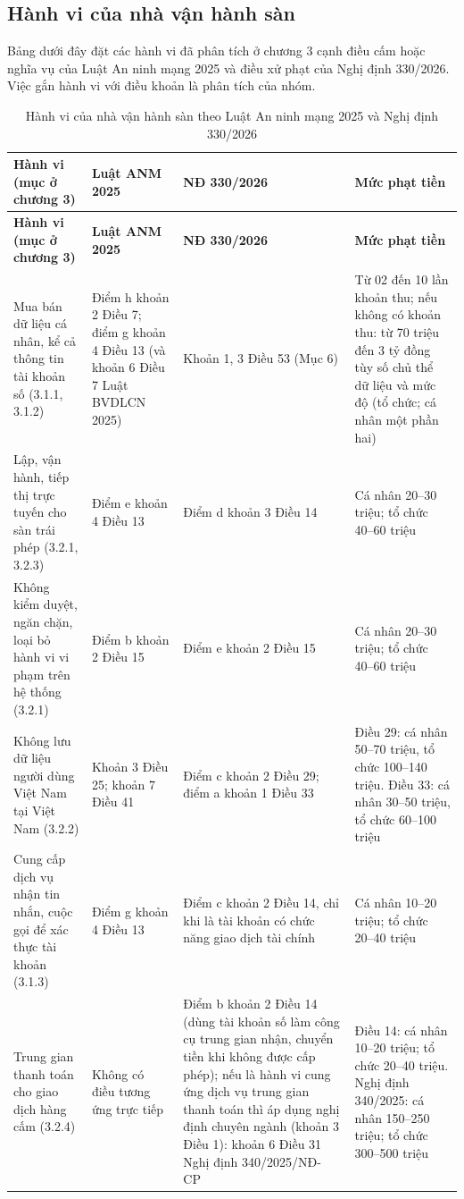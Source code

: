 \subsection{Hành vi của nhà vận hành sàn}\label{sec:7.2}

Bảng dưới đây đặt các hành vi đã phân tích ở chương 3 cạnh điều cấm hoặc nghĩa vụ của Luật An ninh mạng 2025 và điều xử phạt của Nghị định 330/2026. Việc gắn hành vi với điều khoản là phân tích của nhóm.

{\small{}
\begin{xltabular}{\textwidth}{>{\hsize\raggedright\arraybackslash}X>{\hsize\raggedright\arraybackslash}X>{\hsize\raggedright\arraybackslash}X>{\hsize\raggedright\arraybackslash}X}
\caption{Hành vi của nhà vận hành sàn theo Luật An ninh mạng 2025 và Nghị định 330/2026}\label{tab:7.1}\\
\toprule
\textbf{Hành vi (mục ở chương 3)} & \textbf{Luật ANM 2025} & \textbf{NĐ 330/2026} & \textbf{Mức phạt tiền} \\
\midrule
\endfirsthead
\toprule
\textbf{Hành vi (mục ở chương 3)} & \textbf{Luật ANM 2025} & \textbf{NĐ 330/2026} & \textbf{Mức phạt tiền} \\
\midrule
\endhead
\bottomrule
\endlastfoot
Mua bán dữ liệu cá nhân, kể cả thông tin tài khoản số (3.1.1, 3.1.2) & Điểm h khoản 2 Điều 7; điểm g khoản 4 Điều 13 (và khoản 6 Điều 7 Luật BVDLCN 2025) & Khoản 1, 3 Điều 53 (Mục 6) & Từ 02 đến 10 lần khoản thu; nếu không có khoản thu: từ 70 triệu đến 3 tỷ đồng tùy số chủ thể dữ liệu và mức độ (tổ chức; cá nhân một phần hai) \\
Lập, vận hành, tiếp thị trực tuyến cho sàn trái phép (3.2.1, 3.2.3) & Điểm e khoản 4 Điều 13 & Điểm d khoản 3 Điều 14 & Cá nhân 20--30 triệu; tổ chức 40--60 triệu \\
Không kiểm duyệt, ngăn chặn, loại bỏ hành vi vi phạm trên hệ thống (3.2.1) & Điểm b khoản 2 Điều 15 & Điểm e khoản 2 Điều 15 & Cá nhân 20--30 triệu; tổ chức 40--60 triệu \\
Không lưu dữ liệu người dùng Việt Nam tại Việt Nam (3.2.2) & Khoản 3 Điều 25; khoản 7 Điều 41 & Điểm c khoản 2 Điều 29; điểm a khoản 1 Điều 33 & Điều 29: cá nhân 50--70 triệu, tổ chức 100--140 triệu. Điều 33: cá nhân 30--50 triệu, tổ chức 60--100 triệu \\
Cung cấp dịch vụ nhận tin nhắn, cuộc gọi để xác thực tài khoản (3.1.3) & Điểm g khoản 4 Điều 13 & Điểm c khoản 2 Điều 14, chỉ khi là tài khoản có chức năng giao dịch tài chính & Cá nhân 10--20 triệu; tổ chức 20--40 triệu \\
Trung gian thanh toán cho giao dịch hàng cấm (3.2.4) & Không có điều tương ứng trực tiếp & Điểm b khoản 2 Điều 14 (dùng tài khoản số làm công cụ trung gian nhận, chuyển tiền khi không được cấp phép); nếu là hành vi cung ứng dịch vụ trung gian thanh toán thì áp dụng nghị định chuyên ngành (khoản 3 Điều 1): khoản 6 Điều 31 Nghị định 340/2025/NĐ-CP~\cite{nd340-2025} & Điều 14: cá nhân 10--20 triệu; tổ chức 20--40 triệu. Nghị định 340/2025: cá nhân 150--250 triệu; tổ chức 300--500 triệu \\
\end{xltabular}}

